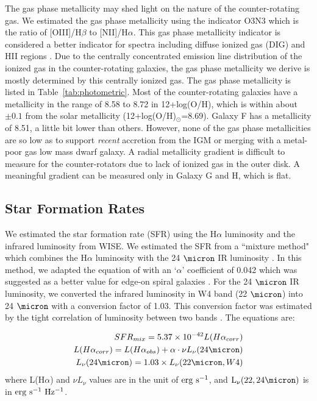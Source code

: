 \documentclass[fleqn,usenatbib]{mnras}
\begin{document}
The gas phase metallicity may shed light on the nature 
of the counter-rotating gas.
We estimated the gas phase metallicity using the indicator O3N3 which is the ratio of [OIII]/H$\beta$ to [NII]/H$\alpha$.
This gas phase metallicity indicator is 
considered a better indicator for spectra including
diffuse ionized gas (DIG) and HII regions \citep{Curti2017}.
Due to the centrally concentrated emission line distribution of the ionized gas in the counter-rotating galaxies, the gas phase metallicity we derive is mostly determined by 
this centrally ionized gas.
The gas phase metallicity is listed in Table~\ref{tab:photometric}.
Most of the counter-rotating galaxies 
have a metallicity in the range of 8.58 to 8.72 in 12+log(O/H), which is within about $\pm 0.1$ from the solar metallicity (12+log(O/H)$_{\odot}$=8.69).
Galaxy F has a metallicity of 8.51, a little bit lower than others.
However, none of the gas phase metallicities are so low 
as to support {\it recent} accretion from the IGM or merging with a metal-poor gas low mass dwarf galaxy. A radial metallicity gradient 
is difficult to measure for the counter-rotators 
due to lack of ionized gas in the outer disk.
A meaningful gradient can be measured only in Galaxy G and H,
which is flat. 

\subsection{Star Formation Rates} \label{sec:SFR}

We estimated the star formation rate (SFR) using the
H$\alpha$ luminosity
and the infrared luminosity from WISE.
We estimated the SFR from a ``mixture method" which combines the H$\alpha$ luminosity with the 24 $\micron$ IR luminosity \citep{Calzetti2007}.
In this method, we adapted the equation of \citet{Murphy2011} 
with an `$\alpha$' coefficient of 0.042 which was suggested as a better value 
for edge-on spiral galaxies \citep{Vargas2018}.
For the 24 $\micron$ IR luminosity, we converted 
the infrared luminosity in W4 band (22 $\micron$) 
into 24 $\micron$ with a conversion factor of 1.03.
This conversion factor was 
estimated by the tight correlation of luminosity between two bands \citep{Wiegert2015,Jarrett2013}. 
The equations are:

\begin{equation} 
\centering
\begin{split}
SFR_{mix}=5.37\times10^{-42} L(H\alpha_{corr}) \\
L(H\alpha_{corr})=L(H\alpha_{obs})+\alpha \cdot \nu L_{\nu}(24\micron) \\
L_{\nu}(24\micron)=1.03 \times L_{\nu}(22\micron,W4) 
\end{split}
\label{SFR}
\end{equation}
where L(H$\alpha$) and $\nu L_{\nu}$ values are in the unit of 
$\rm erg~s^{-1}$, and $\rm L_{\nu}(22,24\micron)$ is in 
$\rm erg~s^{-1}~Hz^{-1}$. 
\end{document}
